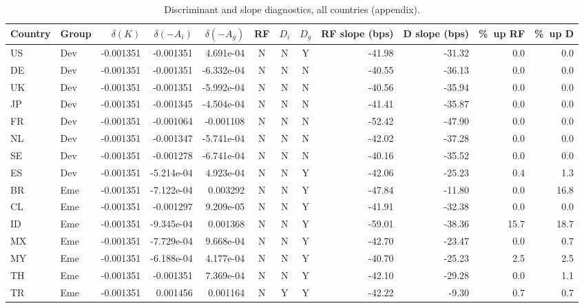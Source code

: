 \begin{table}[H]
\centering
\caption{Discriminant and slope diagnostics, all countries (appendix).}
\label{tab:appendix_full_term_structure_diagnostics}
\begin{tabular}{llrrrcccrrrr}
\toprule
Country & Group & $\delta(K)$ & $\delta(-A_i)$ & $\delta(-A_g)$ & RF & $D_i$ & $D_g$ & RF slope (bps) & D slope (bps) & \%\ up RF & \%\ up D \\
\midrule
US & Dev & -0.001351 & -0.001351 & 4.691e-04 & N & N & Y & -41.98 & -31.32 & 0.0 & 0.0 \\
DE & Dev & -0.001351 & -0.001351 & -6.332e-04 & N & N & N & -40.55 & -36.13 & 0.0 & 0.0 \\
UK & Dev & -0.001351 & -0.001351 & -5.992e-04 & N & N & N & -40.56 & -35.94 & 0.0 & 0.0 \\
JP & Dev & -0.001351 & -0.001345 & -4.504e-04 & N & N & N & -41.41 & -35.87 & 0.0 & 0.0 \\
FR & Dev & -0.001351 & -0.001064 & -0.001108 & N & N & N & -52.42 & -47.90 & 0.0 & 0.0 \\
NL & Dev & -0.001351 & -0.001347 & -5.741e-04 & N & N & N & -42.02 & -37.28 & 0.0 & 0.0 \\
SE & Dev & -0.001351 & -0.001278 & -6.741e-04 & N & N & N & -40.16 & -35.52 & 0.0 & 0.0 \\
ES & Dev & -0.001351 & -5.214e-04 & 4.923e-04 & N & N & Y & -42.06 & -25.23 & 0.4 & 1.3 \\
BR & Eme & -0.001351 & -7.122e-04 & 0.003292 & N & N & Y & -47.84 & -11.80 & 0.0 & 16.8 \\
CL & Eme & -0.001351 & -0.001297 & 9.209e-05 & N & N & Y & -41.91 & -32.38 & 0.0 & 0.0 \\
ID & Eme & -0.001351 & -9.345e-04 & 0.001368 & N & N & Y & -59.01 & -38.36 & 15.7 & 18.7 \\
MX & Eme & -0.001351 & -7.729e-04 & 9.668e-04 & N & N & Y & -42.70 & -23.47 & 0.0 & 0.7 \\
MY & Eme & -0.001351 & -6.188e-04 & 4.177e-04 & N & N & Y & -40.70 & -25.23 & 2.5 & 2.5 \\
TH & Eme & -0.001351 & -0.001351 & 7.369e-04 & N & N & Y & -42.10 & -29.28 & 0.0 & 1.1 \\
TR & Eme & -0.001351 & 0.001456 & 0.001164 & N & Y & Y & -42.22 & -9.30 & 0.7 & 0.7 \\
\bottomrule
\end{tabular}
\end{table}
